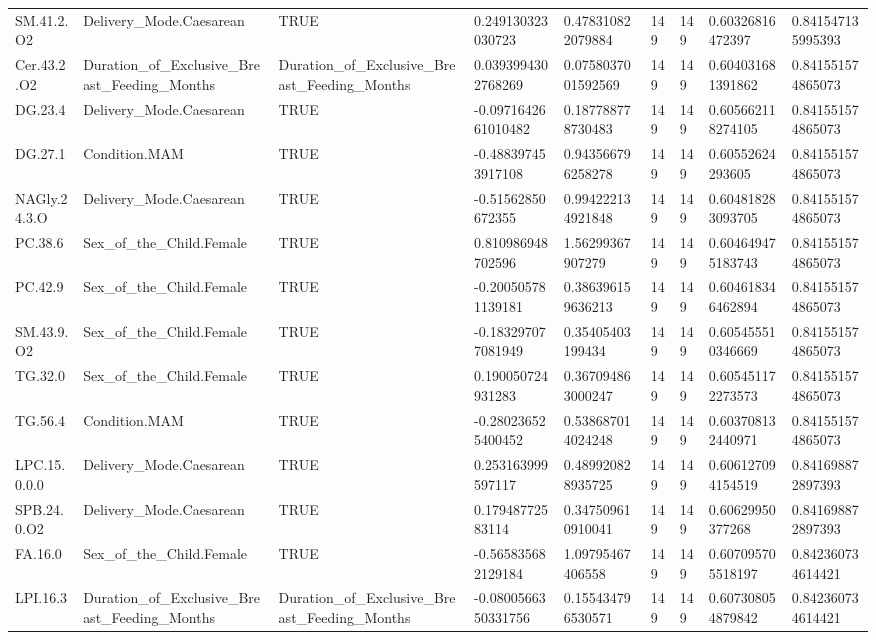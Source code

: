 \begin{longtable}{lllllllll}
SM.41.2.O2 & Delivery\_Mode.Caesarean & TRUE & 0.249130323030723 & 0.478310822079884 & 149 & 149 & 0.60326816472397 & 0.841547135995393 \\
Cer.43.2.O2 & Duration\_of\_Exclusive\_Breast\_Feeding\_Months & Duration\_of\_Exclusive\_Breast\_Feeding\_Months & 0.0393994302768269 & 0.0758037001592569 & 149 & 149 & 0.604031681391862 & 0.841551574865073 \\
DG.23.4 & Delivery\_Mode.Caesarean & TRUE & -0.0971642661010482 & 0.187788778730483 & 149 & 149 & 0.605662118274105 & 0.841551574865073 \\
DG.27.1 & Condition.MAM & TRUE & -0.488397453917108 & 0.943566796258278 & 149 & 149 & 0.60552624293605 & 0.841551574865073 \\
NAGly.24.3.O & Delivery\_Mode.Caesarean & TRUE & -0.51562850672355 & 0.994222134921848 & 149 & 149 & 0.604818283093705 & 0.841551574865073 \\
PC.38.6 & Sex\_of\_the\_Child.Female & TRUE & 0.810986948702596 & 1.56299367907279 & 149 & 149 & 0.604649475183743 & 0.841551574865073 \\
PC.42.9 & Sex\_of\_the\_Child.Female & TRUE & -0.200505781139181 & 0.386396159636213 & 149 & 149 & 0.604618346462894 & 0.841551574865073 \\
SM.43.9.O2 & Sex\_of\_the\_Child.Female & TRUE & -0.183297077081949 & 0.35405403199434 & 149 & 149 & 0.605455510346669 & 0.841551574865073 \\
TG.32.0 & Sex\_of\_the\_Child.Female & TRUE & 0.190050724931283 & 0.367094863000247 & 149 & 149 & 0.605451172273573 & 0.841551574865073 \\
TG.56.4 & Condition.MAM & TRUE & -0.280236525400452 & 0.538687014024248 & 149 & 149 & 0.603708132440971 & 0.841551574865073 \\
LPC.15.0.0.0 & Delivery\_Mode.Caesarean & TRUE & 0.253163999597117 & 0.489920828935725 & 149 & 149 & 0.606127094154519 & 0.841698872897393 \\
SPB.24.0.O2 & Delivery\_Mode.Caesarean & TRUE & 0.17948772583114 & 0.347509610910041 & 149 & 149 & 0.60629950377268 & 0.841698872897393 \\
FA.16.0 & Sex\_of\_the\_Child.Female & TRUE & -0.565835682129184 & 1.09795467406558 & 149 & 149 & 0.607095705518197 & 0.842360734614421 \\
LPI.16.3 & Duration\_of\_Exclusive\_Breast\_Feeding\_Months & Duration\_of\_Exclusive\_Breast\_Feeding\_Months & -0.0800566350331756 & 0.155434796530571 & 149 & 149 & 0.607308054879842 & 0.842360734614421 \\

\end{longtable}
